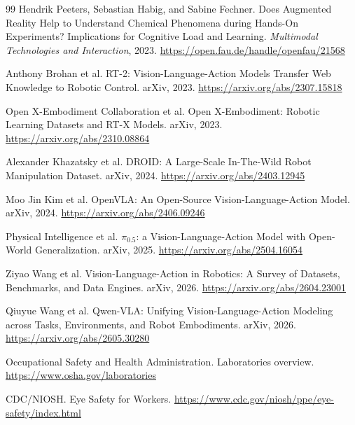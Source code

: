 \documentclass[11pt]{article}
\begin{document}
\begin{thebibliography}{99}
Hendrik Peeters, Sebastian Habig, and Sabine Fechner.
Does Augmented Reality Help to Understand Chemical Phenomena during Hands-On Experiments? Implications for Cognitive Load and Learning.
\emph{Multimodal Technologies and Interaction}, 2023.
\url{https://open.fau.de/handle/openfau/21568}

Anthony Brohan et al.
RT-2: Vision-Language-Action Models Transfer Web Knowledge to Robotic Control.
arXiv, 2023.
\url{https://arxiv.org/abs/2307.15818}

Open X-Embodiment Collaboration et al.
Open X-Embodiment: Robotic Learning Datasets and RT-X Models.
arXiv, 2023.
\url{https://arxiv.org/abs/2310.08864}

Alexander Khazatsky et al.
DROID: A Large-Scale In-The-Wild Robot Manipulation Dataset.
arXiv, 2024.
\url{https://arxiv.org/abs/2403.12945}

Moo Jin Kim et al.
OpenVLA: An Open-Source Vision-Language-Action Model.
arXiv, 2024.
\url{https://arxiv.org/abs/2406.09246}

Physical Intelligence et al.
$\pi_{0.5}$: a Vision-Language-Action Model with Open-World Generalization.
arXiv, 2025.
\url{https://arxiv.org/abs/2504.16054}

Ziyao Wang et al.
Vision-Language-Action in Robotics: A Survey of Datasets, Benchmarks, and Data Engines.
arXiv, 2026.
\url{https://arxiv.org/abs/2604.23001}

Qiuyue Wang et al.
Qwen-VLA: Unifying Vision-Language-Action Modeling across Tasks, Environments, and Robot Embodiments.
arXiv, 2026.
\url{https://arxiv.org/abs/2605.30280}

Occupational Safety and Health Administration.
Laboratories overview.
\url{https://www.osha.gov/laboratories}

CDC/NIOSH.
Eye Safety for Workers.
\url{https://www.cdc.gov/niosh/ppe/eye-safety/index.html}

\end{thebibliography}
\end{document}
